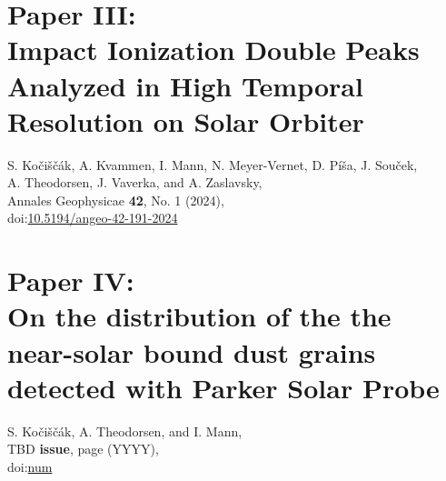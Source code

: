 \documentclass[11pt,twoside,openright]{book}
\begin{document}
\chapter{Paper III: \\ Impact Ionization Double Peaks Analyzed in High Temporal Resolution on Solar Orbiter}
S. Ko{\v{c}}i{\v{s}}{\v{c}}{\'a}k, A. Kvammen, I. Mann, N. Meyer-Vernet, D. P{\'i}{\v{s}}a, J. Sou{\v{c}}ek, \\ A. Theodorsen, J. Vaverka, and A. Zaslavsky,\\
Annales Geophysicae {\bf 42}, No. 1 (2024),\\
doi:\href{https://doi.org/10.5194/angeo-42-191-2024}{10.5194/angeo-42-191-2024}
\newpage\null\newpage



\chapter{Paper IV: \\ On the distribution of the the near-solar bound dust grains detected with Parker Solar Probe}
S. Ko{\v{c}}i{\v{s}}{\v{c}}{\'a}k, A. Theodorsen, and I. Mann,\\
TBD {\bf issue}, page (YYYY),\\
doi:\href{https://doi.org/num}{num}
\newpage\null\newpage



% 


\end{document}
